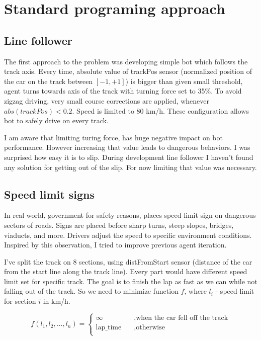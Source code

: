 \documentclass[declaration,shortabstract,english,inz]{iithesis}
\begin{document}
\chapter{Standard programing approach}

\section{Line follower}

The first approach to the problem was developing simple bot which follows the track axis. Every time, absolute value of trackPos sensor (normalized position of the car on the track between $[-1, +1]$) is bigger than given small threshold, agent turns towards axis of the track with turning force set to 35\%. To avoid zigzag driving, very small course corrections are applied, whenever $abs(trackPos) < 0.2$. Speed is limited to 80 km/h. These configuration allows bot to safely drive on every track. 

I am aware that limiting turing force, has huge negative impact on bot performance. However increasing that value leads to dangerous behaviors. I was surprised how easy it is to slip. During development line follower I haven't found any solution for getting out of the slip. For now limiting that value was necessary.

\section{Speed limit signs}

In real world, government for safety reasons, places speed limit sign on dangerous sectors of roads. Signs are placed before sharp turns, steep slopes, bridges, viaducts, and more. Drivers adjust the speed to specific environment conditions. Inspired by this observation, I tried to improve previous agent iteration. 

I've split the track on 8 sections, using distFromStart sensor (distance of the car from the start line along the track line). Every part would have different speed limit set for specific track. The goal is to finish the lap as fast as we can while not falling out of the track. So we need to minimize function $f$, where $l_i$ - speed limit for section $i$ in km/h.

$$ f(l_1, l_2, \dots, l_n ) =  \begin{cases}
    \infty &\quad , \text{when the car fell off the track}\\
    \text{lap\_time}  &\quad , \text{otherwise} \\
  \end{cases}
 $$
\end{document}
